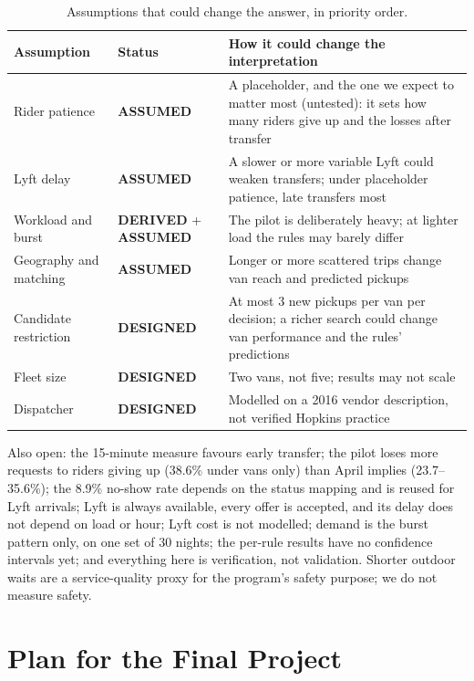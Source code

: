 \documentclass{article}
\newcommand{\lab}[1]{{\footnotesize\textsf{\textbf{#1}}}}
\newcommand{\DER}{\lab{DERIVED}}
\newcommand{\ASM}{\lab{ASSUMED}}
\newcommand{\DES}{\lab{DESIGNED}}
\begin{document}
\begin{table}[t]
\centering\small
\caption{Assumptions that could change the answer, in priority order.}\label{tab:assumptions}
\begin{tabularx}{\columnwidth}{@{}P{1.45cm}P{1.75cm}L@{}}
\toprule
\textbf{Assumption} & \textbf{Status} & \textbf{How it could change the interpretation}\\
\midrule
Rider patience & \ASM & A placeholder, and the one we expect to matter most (untested): it sets how many riders give up and the losses after transfer\\
Lyft delay & \ASM & A slower or more variable Lyft could weaken transfers; under placeholder patience, late transfers most\\
Workload and burst & \DER{} + \ASM & The pilot is deliberately heavy; at lighter load the rules may barely differ\\
Geography and matching & \ASM & Longer or more scattered trips change van reach and predicted pickups\\
Candidate restriction & \DES & At most 3 new pickups per van per decision; a richer search could change van performance and the rules' predictions\\
Fleet size & \DES & Two vans, not five; results may not scale\\
Dispatcher & \DES & Modelled on a 2016 vendor description, not verified Hopkins practice\\
\bottomrule
\end{tabularx}
\end{table}

Also open: the 15-minute measure favours early transfer; the pilot loses more requests to riders giving up (38.6\% under vans only) than April implies (23.7--35.6\%); the 8.9\% no-show rate depends on the status mapping and is reused for Lyft arrivals; Lyft is always available, every offer is accepted, and its delay does not depend on load or hour; Lyft cost is not modelled; demand is the burst pattern only, on one set of 30 nights; the per-rule results have no confidence intervals yet; and everything here is verification, not validation. Shorter outdoor waits are a service-quality proxy for the program's safety purpose; we do not measure safety.

\section{Plan for the Final Project}\label{sec:plan}
\end{document}

